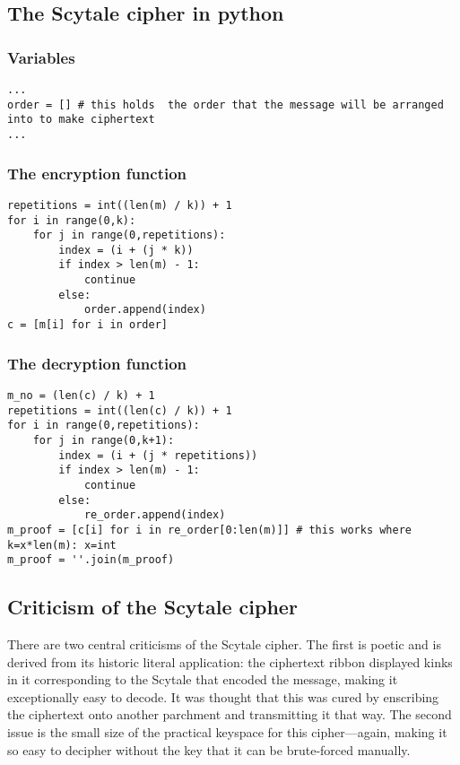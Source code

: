 \documentclass{AIAA}
\begin{document}
\subsection{The Scytale cipher in python}

\subsubsection{Variables}

\begin{verbatim}
...
order = [] # this holds  the order that the message will be arranged into to make ciphertext
...
\end{verbatim}

\subsubsection{The encryption function}

\begin{verbatim}
repetitions = int((len(m) / k)) + 1
for i in range(0,k):
    for j in range(0,repetitions):
        index = (i + (j * k))
        if index > len(m) - 1:
            continue
        else:
            order.append(index)
c = [m[i] for i in order]
\end{verbatim}

\subsubsection{The decryption function}

\begin{verbatim}
m_no = (len(c) / k) + 1
repetitions = int((len(c) / k)) + 1
for i in range(0,repetitions):
    for j in range(0,k+1):
        index = (i + (j * repetitions))
        if index > len(m) - 1:
            continue
        else:
            re_order.append(index)
m_proof = [c[i] for i in re_order[0:len(m)]] # this works where k=x*len(m): x=int
m_proof = ''.join(m_proof)
\end{verbatim}

\subsection{Criticism of the Scytale cipher}

There are two central criticisms of the Scytale cipher. The first is poetic and is derived from its historic literal application: the ciphertext ribbon displayed kinks in it corresponding to the Scytale that encoded the message, making it exceptionally easy to decode. It was thought that this was cured by enscribing the ciphertext onto another parchment and transmitting it that way.  The second issue is the small size of the practical keyspace for this cipher---again, making it so easy to decipher without the key that it can be brute-forced manually.
\end{document}
